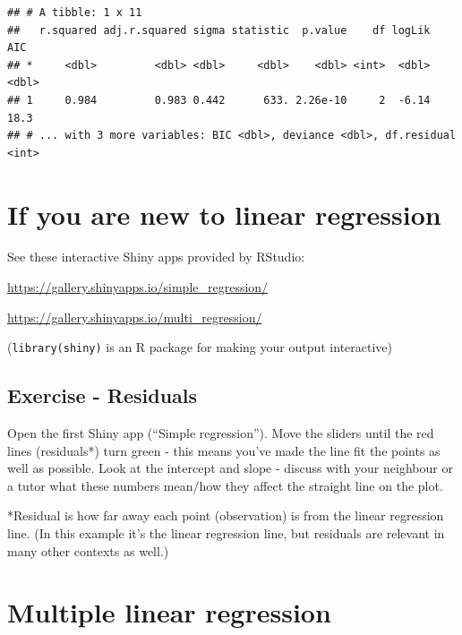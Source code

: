 \documentclass[]{book}
\makeatletter
\newenvironment{Shaded}{\begin{snugshade}}{\end{snugshade}}
\newcommand{\KeywordTok}[1]{\textcolor[rgb]{0.13,0.29,0.53}{\textbf{#1}}}
\newcommand{\NormalTok}[1]{#1}
\newcommand{\OperatorTok}[1]{\textcolor[rgb]{0.81,0.36,0.00}{\textbf{#1}}}
\newcommand{\StringTok}[1]{\textcolor[rgb]{0.31,0.60,0.02}{#1}}
\newenvironment{kframe}{%
\medskip{}
\setlength{\fboxsep}{.8em}
 \def\at@end@of@kframe{}%
 \ifinner\ifhmode%
  \def\at@end@of@kframe{\end{minipage}}%
  \begin{minipage}{\columnwidth}%
 \fi\fi%
 \def\FrameCommand##1{\hskip\@totalleftmargin \hskip-\fboxsep
 \colorbox{shadecolor}{##1}\hskip-\fboxsep
     \hskip-\linewidth \hskip-\@totalleftmargin \hskip\columnwidth}%
 \MakeFramed {\advance\hsize-\width
   \@totalleftmargin\z@ \linewidth\hsize
   \@setminipage}}%
 {\par\unskip\endMakeFramed%
 \at@end@of@kframe}
\renewenvironment{Shaded}{\begin{kframe}}{\end{kframe}}
\theoremstyle{definition}
\theoremstyle{definition}
\theoremstyle{definition}
\theoremstyle{remark}
\makeatother
\begin{document}
\begin{Shaded}
\end{Shaded}

\begin{verbatim}
## # A tibble: 1 x 11
##   r.squared adj.r.squared sigma statistic  p.value    df logLik   AIC
## *     <dbl>         <dbl> <dbl>     <dbl>    <dbl> <int>  <dbl> <dbl>
## 1     0.984         0.983 0.442      633. 2.26e-10     2  -6.14  18.3
## # ... with 3 more variables: BIC <dbl>, deviance <dbl>, df.residual <int>
\end{verbatim}

\hypertarget{if-you-are-new-to-linear-regression}{%
\section{If you are new to linear
regression}\label{if-you-are-new-to-linear-regression}}

See these interactive Shiny apps provided by RStudio:

\url{https://gallery.shinyapps.io/simple_regression/}

\url{https://gallery.shinyapps.io/multi_regression/}

(\texttt{library(shiny)} is an R package for making your output
interactive)

\hypertarget{exercise---residuals}{%
\subsection{Exercise - Residuals}\label{exercise---residuals}}

Open the first Shiny app (``Simple regression''). Move the sliders until
the red lines (residuals*) turn green - this means you've made the line
fit the points as well as possible. Look at the intercept and slope -
discuss with your neighbour or a tutor what these numbers mean/how they
affect the straight line on the plot.

*Residual is how far away each point (observation) is from the linear
regression line. (In this example it's the linear regression line, but
residuals are relevant in many other contexts as well.)

\hypertarget{multiple-linear-regression}{%
\section{Multiple linear regression}\label{multiple-linear-regression}}
\end{document}
